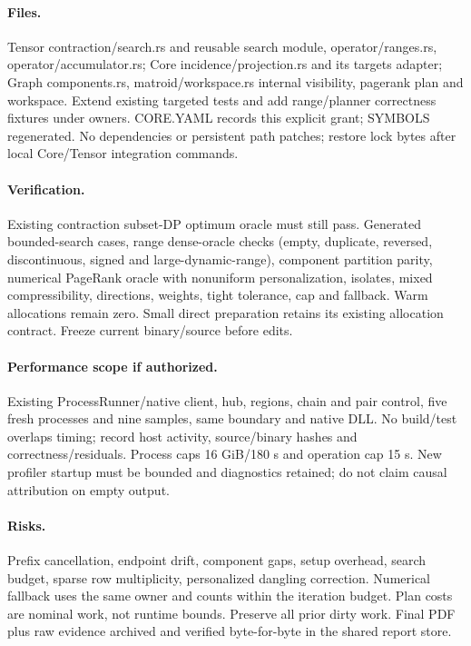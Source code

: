 \documentclass[11pt,a4paper]{article}
\begin{document}
\paragraph{Files.} Tensor contraction/search.rs and reusable search module, operator/ranges.rs,
operator/accumulator.rs; Core incidence/projection.rs and its targets adapter; Graph
components.rs, matroid/workspace.rs internal visibility, pagerank plan and workspace.
Extend existing targeted tests and add range/planner correctness fixtures under owners.
CORE.YAML records this explicit grant; SYMBOLS regenerated. No dependencies or persistent
path patches; restore lock bytes after local Core/Tensor integration commands.
\paragraph{Verification.} Existing contraction subset-DP optimum oracle must still pass.
Generated bounded-search cases, range dense-oracle checks (empty, duplicate, reversed,
discontinuous, signed and large-dynamic-range), component partition parity, numerical
PageRank oracle with nonuniform personalization, isolates, mixed compressibility, directions,
weights, tight tolerance, cap and fallback. Warm allocations remain zero. Small direct
preparation retains its existing allocation contract. Freeze current binary/source before edits.
\paragraph{Performance scope if authorized.} Existing ProcessRunner/native client, hub,
regions, chain and pair control, five fresh processes and nine samples, same boundary and
native DLL. No build/test overlaps timing; record host activity, source/binary hashes and
correctness/residuals. Process caps 16 GiB/180 s and operation cap 15 s. New profiler startup
must be bounded and diagnostics retained; do not claim causal attribution on empty output.
\paragraph{Risks.} Prefix cancellation, endpoint drift, component gaps, setup overhead,
search budget, sparse row multiplicity, personalized dangling correction. Numerical fallback
uses the same owner and counts within the iteration budget. Plan costs are nominal work,
not runtime bounds. Preserve all prior dirty work. Final PDF plus raw evidence archived
and verified byte-for-byte in the shared report store.
\end{document}
